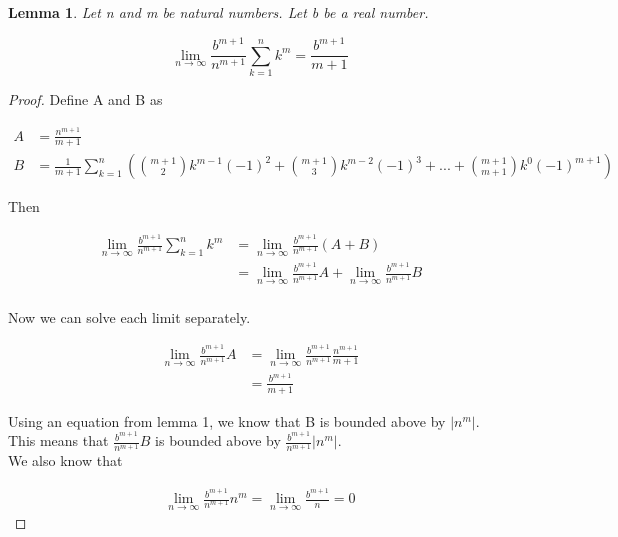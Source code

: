 \documentclass{article}
\newtheorem{lemma}{Lemma}
\begin{document}
\begin{lemma}
Let n and m be natural numbers. Let b be a real number.

\begin{equation*}
\lim_{n \to \infty} \frac{b^{m+1}}{n^{m+1}} \sum_{k=1}^{n} k^{m} = \displaystyle \frac{b^{m+1}}{m+1}
\end{equation*}
\end{lemma}

\begin{proof}

Define A and B as 

\begin{align*}
A &= \displaystyle \frac{n^{m+1}}{m+1} \\
B &= \frac{1}{m+1} \displaystyle \sum_{k=1}^{n} \left( \binom{m+1}{2} k^{m-1} (-1)^2 +  \binom{m+1}{3} k^{m-2} (-1)^3 + ... +  \binom{m+1}{m+1} k^{0} (-1)^{m+1} \right) 
\end{align*}

Then

\begin{align*}
\lim_{n \to \infty} \frac{b^{m+1}}{n^{m+1}} \sum_{k=1}^{n} k^{m} &= \lim_{n \to \infty} \frac{b^{m+1}}{n^{m+1}} (A + B) \\
&= \lim_{n \to \infty} \frac{b^{m+1}}{n^{m+1}} A + \lim_{n \to \infty} \frac{b^{m+1}}{n^{m+1}} B \\
\end{align*}

Now we can solve each limit separately.

\begin{align*}
\lim_{n \to \infty} \frac{b^{m+1}}{n^{m+1}} A &=  \lim_{n \to \infty} \frac{b^{m+1}}{n^{m+1}} \frac{n^{m+1}}{m+1} \\
&=  \frac{b^{m+1}}{m+1} 
\end{align*}

Using an equation from lemma 1, we know that B is bounded above by $|n^{m}|$. \\

This means that $\displaystyle \frac{b^{m+1}}{n^{m+1}} B$ is bounded above by $\displaystyle \frac{b^{m+1}}{n^{m+1}} |n^{m}|$. \\

We also know that

\begin{align*}
\lim_{n \to \infty} \frac{b^{m+1}}{n^{m+1}} n^{m} = \lim_{n \to \infty} \frac{b^{m+1}}{n} = 0
\end{align*} 


\end{proof}
\end{document}

